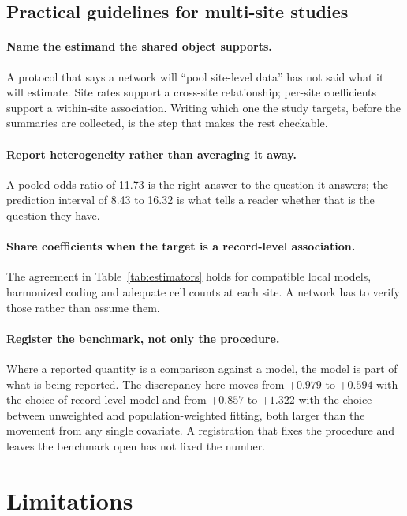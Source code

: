 \documentclass[11pt]{article}
\begin{document}
\subsection{Practical guidelines for multi-site studies}

\paragraph{Name the estimand the shared object supports.}
A protocol that says a network will ``pool site-level data'' has not
said what it will estimate.  Site rates support a cross-site
relationship; per-site coefficients support a within-site association.
Writing which one the study targets, before the summaries are
collected, is the step that makes the rest checkable.

\paragraph{Report heterogeneity rather than averaging it away.}
A pooled odds ratio of 11.73 is the right answer to the question it
answers; the prediction interval of 8.43 to 16.32 is what tells a
reader whether that is the question they have.

\paragraph{Share coefficients when the target is a record-level
association.}  The agreement in Table~\ref{tab:estimators} holds for
compatible local models, harmonized coding and adequate cell counts at
each site.  A network has to verify those rather than assume them.

\paragraph{Register the benchmark, not only the procedure.}
Where a reported quantity is a comparison against a model, the model is
part of what is being reported.  The discrepancy here moves from
$+0.979$ to $+0.594$ with the choice of record-level model and from
$+0.857$ to $+1.322$ with the choice between unweighted and
population-weighted fitting, both larger than the movement from any
single covariate.  A registration that fixes the procedure and leaves
the benchmark open has not fixed the number.

\section{Limitations}
\end{document}
